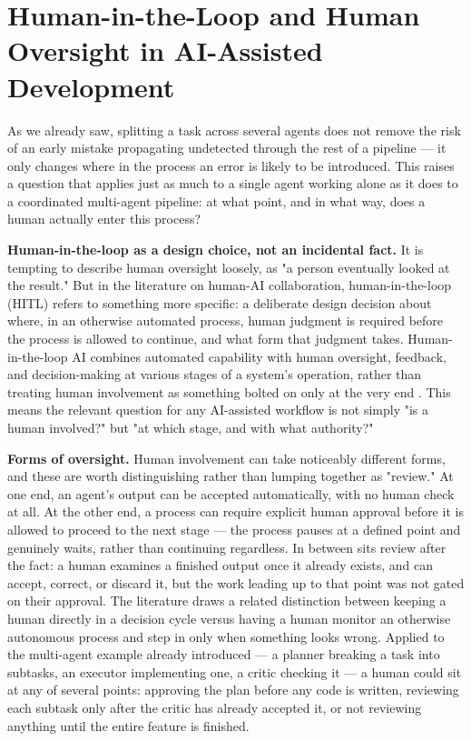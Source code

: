 \section{Human-in-the-Loop and Human Oversight in AI-Assisted Development}

As we already saw, splitting a task across several agents does not remove the risk of an early mistake propagating undetected through the rest of a pipeline --- it only changes where in the process an error is likely to be introduced. This raises a question that applies just as much to a single agent working alone as it does to a coordinated multi-agent pipeline: at what point, and in what way, does a human actually enter this process?

\textbf{Human-in-the-loop as a design choice, not an incidental fact.} It is tempting to describe human oversight loosely, as "a person eventually looked at the result." But in the literature on human-AI collaboration, human-in-the-loop (HITL) refers to something more specific: a deliberate design decision about where, in an otherwise automated process, human judgment is required before the process is allowed to continue, and what form that judgment takes. Human-in-the-loop AI combines automated capability with human oversight, feedback, and decision-making at various stages of a system's operation, rather than treating human involvement as something bolted on only at the very end \cite{lazaros2026humanintheloop}. This means the relevant question for any AI-assisted workflow is not simply "is a human involved?" but "at which stage, and with what authority?"

\textbf{Forms of oversight.} Human involvement can take noticeably different forms, and these are worth distinguishing rather than lumping together as "review." At one end, an agent's output can be accepted automatically, with no human check at all. At the other end, a process can require explicit human approval before it is allowed to proceed to the next stage --- the process pauses at a defined point and genuinely waits, rather than continuing regardless. In between sits review after the fact: a human examines a finished output once it already exists, and can accept, correct, or discard it, but the work leading up to that point was not gated on their approval. The literature draws a related distinction between keeping a human directly in a decision cycle versus having a human monitor an otherwise autonomous process and step in only when something looks wrong. Applied to the multi-agent example already introduced --- a planner breaking a task into subtasks, an executor implementing one, a critic checking it --- a human could sit at any of several points: approving the plan before any code is written, reviewing each subtask only after the critic has already accepted it, or not reviewing anything until the entire feature is finished.

